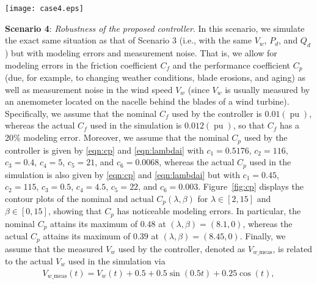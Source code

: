 \documentclass[journal]{IEEEtran}
\begin{document}
\begin{figure*}[tb]
\centering\texttt{[image: case4.eps]}
\caption{Scenario 4 illustrating the robustness of the proposed controller to modeling errors in $C_f$ and $C_p$ and noisy measurements in $V_w$.}
\label{fig:res4}
\end{figure*}

{\bf Scenario 4}: {\em Robustness of the proposed controller}.
In this scenario, we simulate the exact same situation as that of Scenario 3 (i.e., with the same $V_w$, $P_d$, and $Q_d$) but with modeling errors and measurement noise. That is, we allow for modeling errors in the friction coefficient $C_f$ and the performance coefficient $C_p$ (due, for example, to changing weather conditions, blade erosions, and aging) as well as measurement noise in the wind speed $V_w$ (since $V_w$ is usually measured by an anemometer located on the nacelle behind the blades of a wind turbine). Specifically, we assume that the nominal $C_f$ used by the controller is $0.01(\operatorname{pu})$, whereas the actual $C_f$ used in the simulation is $0.012(\operatorname{pu})$, so that $C_f$ has a 20\% modeling error. Moreover, we assume that the nominal $C_p$ used by the controller is given by \eqref{eqn:cp} and \eqref{eqn:lambdai} with $c_1=0.5176$, $c_2=116$, $c_3=0.4$, $c_4=5$, $c_5=21$, and $c_6=0.0068$, whereas the actual $C_p$ used in the simulation is also given by \eqref{eqn:cp} and \eqref{eqn:lambdai} but with $c_1=0.45$, $c_2=115$, $c_3=0.5$, $c_4=4.5$, $c_5=22$, and $c_6=0.003$.
Figure~\ref{fig:cp} displays the contour plots of the nominal and actual $C_p(\lambda,\beta)$ for $\lambda\in[2,15]$ and $\beta\in[0,15]$, showing that $C_p$ has noticeable modeling errors. In particular, the nominal $C_p$ attains its maximum of $0.48$ at $(\lambda, \beta)=(8.1,0)$, whereas the actual $C_p$ attains its maximum of $0.39$ at $(\lambda, \beta)=(8.45,0)$. Finally, we assume that the measured $V_w$ used by the controller, denoted as $V_{w\_\text{meas}}$, is related to the actual $V_w$ used in the simulation via
\begin{align*}
V_{w\_\text{meas}}(t)=V_w(t)+0.5+0.5\sin(0.5t)+0.25\cos(t),
\end{align*}
\end{document}
